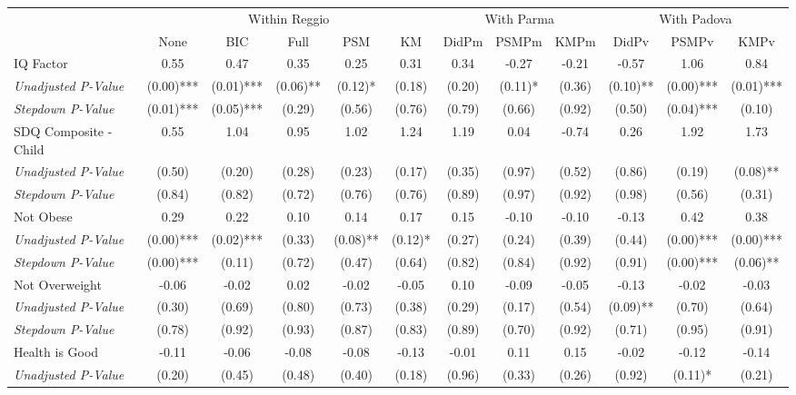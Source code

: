 \begin{tabular}{l c c c c c c c c c c c}
\toprule
& \multicolumn{5}{c}{Within Reggio} & \multicolumn{3}{c}{With Parma} & \multicolumn{3}{c}{With Padova} \\\cmidrule(lr){2-6} \cmidrule(lr){7-9} \cmidrule(lr){10-12}
 & None & BIC & Full & PSM & KM & DidPm & PSMPm & KMPm & DidPv & PSMPv & KMPv \\
\midrule
IQ Factor & 0.55 & 0.47 & 0.35 & 0.25 & 0.31 & 0.34 & -0.27 & -0.21 & -0.57 & 1.06 & 0.84 \\
\quad \textit{Unadjusted P-Value} & (0.00)*** & (0.01)*** & (0.06)** & (0.12)* & (0.18) & (0.20) & (0.11)* & (0.36) & (0.10)** & (0.00)*** & (0.01)*** \\
\quad \textit{Stepdown P-Value} & (0.01)*** & (0.05)*** & (0.29) & (0.56) & (0.76) & (0.79) & (0.66) & (0.92) & (0.50) & (0.04)*** & (0.10) \\
SDQ Composite - Child & 0.55 & 1.04 & 0.95 & 1.02 & 1.24 & 1.19 & 0.04 & -0.74 & 0.26 & 1.92 & 1.73 \\
\quad \textit{Unadjusted P-Value} & (0.50) & (0.20) & (0.28) & (0.23) & (0.17) & (0.35) & (0.97) & (0.52) & (0.86) & (0.19) & (0.08)** \\
\quad \textit{Stepdown P-Value} & (0.84) & (0.82) & (0.72) & (0.76) & (0.76) & (0.89) & (0.97) & (0.92) & (0.98) & (0.56) & (0.31) \\
Not Obese & 0.29 & 0.22 & 0.10 & 0.14 & 0.17 & 0.15 & -0.10 & -0.10 & -0.13 & 0.42 & 0.38 \\
\quad \textit{Unadjusted P-Value} & (0.00)*** & (0.02)*** & (0.33) & (0.08)** & (0.12)* & (0.27) & (0.24) & (0.39) & (0.44) & (0.00)*** & (0.00)*** \\
\quad \textit{Stepdown P-Value} & (0.00)*** & (0.11) & (0.72) & (0.47) & (0.64) & (0.82) & (0.84) & (0.92) & (0.91) & (0.00)*** & (0.06)** \\
Not Overweight & -0.06 & -0.02 & 0.02 & -0.02 & -0.05 & 0.10 & -0.09 & -0.05 & -0.13 & -0.02 & -0.03 \\
\quad \textit{Unadjusted P-Value} & (0.30) & (0.69) & (0.80) & (0.73) & (0.38) & (0.29) & (0.17) & (0.54) & (0.09)** & (0.70) & (0.64) \\
\quad \textit{Stepdown P-Value} & (0.78) & (0.92) & (0.93) & (0.87) & (0.83) & (0.89) & (0.70) & (0.92) & (0.71) & (0.95) & (0.91) \\
Health is Good & -0.11 & -0.06 & -0.08 & -0.08 & -0.13 & -0.01 & 0.11 & 0.15 & -0.02 & -0.12 & -0.14 \\
\quad \textit{Unadjusted P-Value} & (0.20) & (0.45) & (0.48) & (0.40) & (0.18) & (0.96) & (0.33) & (0.26) & (0.92) & (0.11)* & (0.21) \\

\end{tabular}
